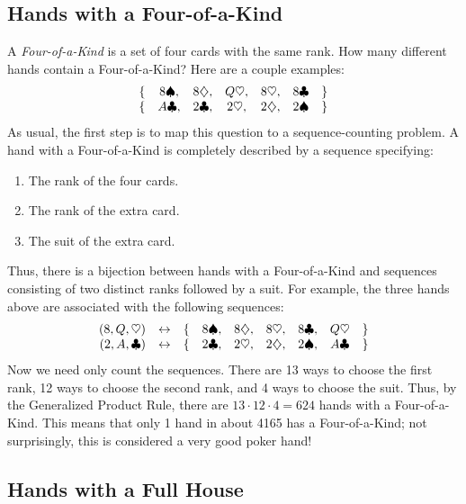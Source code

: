 \subsection{Hands with a Four-of-a-Kind}

A \emph{Four-of-a-Kind} is a set of four cards with the same rank.
How many different hands contain a Four-of-a-Kind?  Here are a couple
examples:
%
\[
\begin{array}{rcccccl}
\{ & 8 \spadesuit, & 8 \diamondsuit, & Q \heartsuit, & 8 \heartsuit, & 8 \clubsuit & \} \\
\{ & A \clubsuit, & 2 \clubsuit, & 2 \heartsuit, & 2 \diamondsuit, & 2 \spadesuit & \} \\
\end{array}
\]
%
As usual, the first step is to map this question to a
sequence-counting problem.  A hand with a Four-of-a-Kind is completely
described by a sequence specifying:
%
\begin{enumerate}
\item The rank of the four cards.
\item The rank of the extra card.
\item The suit of the extra card.
\end{enumerate}
%
Thus, there is a bijection between hands with a Four-of-a-Kind and
sequences consisting of two distinct ranks followed by a suit.  For
example, the three hands above are associated with the following
sequences:
%
\[
\begin{array}{rccccclcl}
(8, Q, \heartsuit) & \leftrightarrow &
  \{ & 8 \spadesuit, & 8 \diamondsuit, & 8 \heartsuit, & 8 \clubsuit, & Q \heartsuit & \} \\
(2, A, \clubsuit) & \leftrightarrow &
  \{ & 2 \clubsuit, & 2 \heartsuit, & 2 \diamondsuit, & 2 \spadesuit, & A \clubsuit & \} \\
\end{array}
\]
%
Now we need only count the sequences.  There are 13 ways to choose the
first rank, 12 ways to choose the second rank, and 4 ways to choose
the suit.  Thus, by the Generalized Product Rule, there are $13 \cdot
12 \cdot 4 = 624$ hands with a Four-of-a-Kind.  This means that only 1
hand in about 4165 has a Four-of-a-Kind; not surprisingly, this is
considered a very good poker hand!

\subsection{Hands with a Full House}

